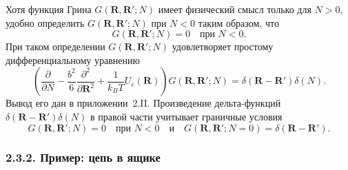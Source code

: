 \documentclass[12pt,a4paper]{article}
\begin{document}
Хотя функция Грина $G(\boldsymbol{R}, \boldsymbol{R}'; N)$ имеет физический смысл только для $N > 0$, удобно определить $G(\boldsymbol{R}, \boldsymbol{R}'; N)$ при $N < 0$ таким образом, что
\begin{equation}
G(\boldsymbol{R}, \boldsymbol{R}'; N) = 0 \quad \text{при } N < 0. \tag{2.52}
\end{equation}
При таком определении $G(\boldsymbol{R}, \boldsymbol{R}'; N)$ удовлетворяет простому дифференциальному уравнению
\begin{equation}
\left(\frac{\partial}{\partial N} - \frac{b^2}{6}\frac{\partial^2}{\partial\boldsymbol{R}^2} + \frac{1}{k_B T}U_e(\boldsymbol{R})\right)G(\boldsymbol{R}, \boldsymbol{R}'; N) = \delta(\boldsymbol{R} - \boldsymbol{R}')\delta(N). \tag{2.53}
\end{equation}
Вывод его дан в приложении~2.II. Произведение дельта-функций $\delta(\boldsymbol{R} - \boldsymbol{R}')\delta(N)$ в правой части учитывает граничные условия
\begin{equation}
G(\boldsymbol{R}, \boldsymbol{R}'; N) = 0 \quad \text{при } N < 0 \quad \text{и} \quad G(\boldsymbol{R}, \boldsymbol{R}'; N = 0) = \delta(\boldsymbol{R} - \boldsymbol{R}'). \tag{2.54}
\end{equation}

\subsubsection*{2.3.2. Пример: цепь в ящике}
\end{document}
